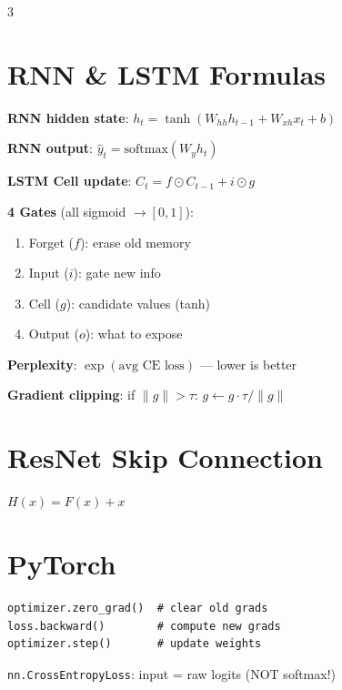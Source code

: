 \documentclass[6pt,landscape,a4paper]{extarticle}
\begin{document}
\begin{multicols}{3}
\section{RNN \& LSTM Formulas}

\textbf{RNN hidden state}: $h_t = \tanh(W_{hh}h_{t-1} + W_{xh}x_t + b)$

\textbf{RNN output}: $\hat{y}_t = \text{softmax}(W_y h_t)$

\textbf{LSTM Cell update}: $C_t = f \odot C_{t-1} + i \odot g$

\textbf{4 Gates} (all sigmoid $\to [0,1]$):
\begin{enumerate}[nosep,leftmargin=*]
\item Forget ($f$): erase old memory
\item Input ($i$): gate new info
\item Cell ($g$): candidate values (tanh)
\item Output ($o$): what to expose
\end{enumerate}

\textbf{Perplexity}: $\exp(\text{avg CE loss})$ --- lower is better

\textbf{Gradient clipping}: if $\|g\| > \tau$: $g \leftarrow g \cdot \tau/\|g\|$

\section{ResNet Skip Connection}

$H(x) = F(x) + x$

\section{PyTorch}
\begin{lstlisting}
optimizer.zero_grad()  # clear old grads
loss.backward()        # compute new grads
optimizer.step()       # update weights
\end{lstlisting}

\texttt{nn.CrossEntropyLoss}: input = raw logits (NOT softmax!)

\end{multicols}

\newpage
\end{document}
